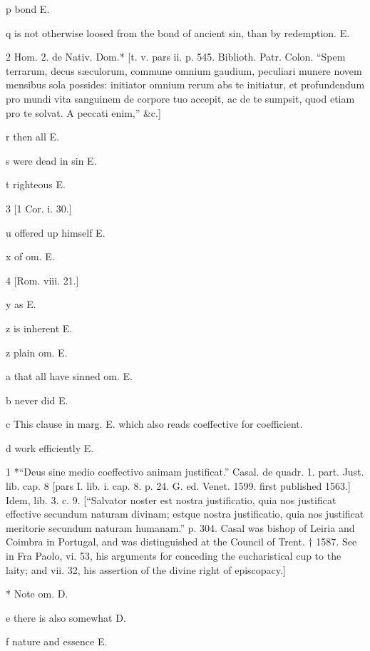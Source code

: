 p
bond E.

q
is not otherwise loosed from the bond of ancient sin, than by redemption. E.

2
Hom. 2. de Nativ. Dom.* [t. v. pars ii. p. 545. Biblioth. Patr. Colon. “Spem terrarum, decus sæculorum, commune omnium gaudium, peculiari munere novem mensibus sola possides: initiator omnium rerum abs te initiatur, et profundendum pro mundi vita sanguinem de corpore tuo accepit, ac de te sumpsit, quod etiam pro te solvat. A peccati enim,” &c.]

r
then all E.

s
were dead in sin E.

t
righteous E.

3
[1 Cor. i. 30.]

u
offered up himself E.

x
of om. E.

4
[Rom. viii. 21.]

y
as E.

z
is inherent E.

z
plain om. E.

a
that all have sinned om. E.

b
never did E.

c
This clause in marg. E. which also reads coeffective for coefficient.

d
work efficiently E.

1
*“Deus sine medio coeffectivo animam justificat.” Casal. de quadr. 1. part. Just. lib. cap. 8 [pars I. lib. i. cap. 8. p. 24. G. ed. Venet. 1599. first published 1563.] Idem, lib. 3. c. 9. [“Salvator noster est nostra justificatio, quia nos justificat effective secundum naturam divinam; estque nostra justificatio, quia nos justificat meritorie secundum naturam humanam.” p. 304. Casal was bishop of Leiria and Coimbra in Portugal, and was distinguished at the Council of Trent. † 1587. See in Fra Paolo, vi. 53, his arguments for conceding the eucharistical cup to the laity; and vii. 32, his assertion of the divine right of episcopacy.]

*
Note om. D.

e
there is also somewhat D.

f
nature and essence E.

